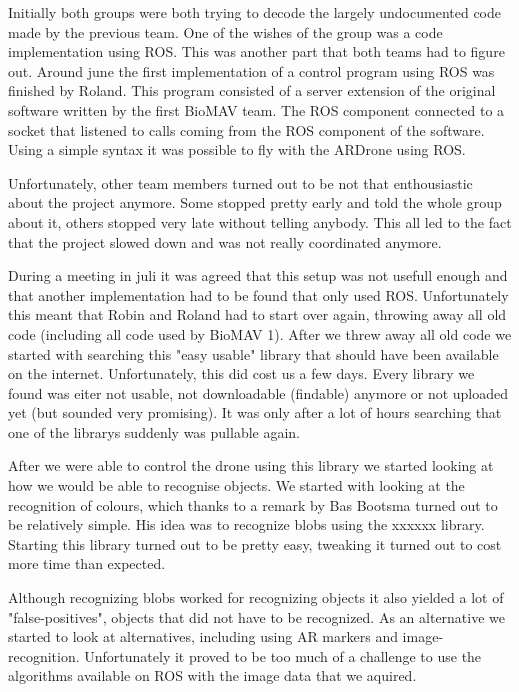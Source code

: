 \documentclass[a4paper,10pt]{article}
\begin{document}
Initially both groups were both trying to decode the largely undocumented code made by the previous team.
One of the wishes of the group was a code implementation using ROS. This was another part that both teams had to figure out.  
Around june the first implementation of a control program using ROS was finished by Roland. 
This program consisted of a server extension of the original software written by the first BioMAV team.  
The ROS component connected to a socket that listened to calls coming from the ROS component of the software. 
Using a simple syntax it was possible to fly with the ARDrone using ROS.  

Unfortunately, other team members turned out to be not that enthousiastic about the project anymore. 
Some stopped pretty early and told the whole group about it, others stopped very late without telling anybody.
This all led to the fact that the project slowed down and was not really coordinated anymore. 

During a meeting in juli it was agreed that this setup was not usefull enough and that another implementation had to be found that only used ROS. 
Unfortunately this meant that Robin and Roland had to start over again, throwing away all old code (including all code used by BioMAV 1).  
After we threw away all old code we started with searching this "easy usable" library that should have been available on the internet. 
Unfortunately, this did cost us a few days. 
Every library we found was eiter not usable, not downloadable (findable) anymore or not uploaded yet (but sounded very promising). 
It was only after a lot of hours searching that one of the librarys suddenly was pullable again. 

After we were able to control the drone using this library we started looking at how we would be able to recognise objects. 
We started with looking at the recognition of colours, which thanks to a remark by Bas Bootsma turned out to be relatively simple. 
His idea was to recognize blobs using the xxxxxx library. 
Starting this library turned out to be pretty easy, tweaking it turned out to cost more time than expected. 

Although recognizing blobs worked for recognizing objects it also yielded a lot of "false-positives", objects that did not have to be recognized.
As an alternative we started to look at alternatives, including using AR markers and image-recognition. 
Unfortunately it proved to be too much of a challenge to use the algorithms available on ROS with the image data that we aquired. 
\end{document}

